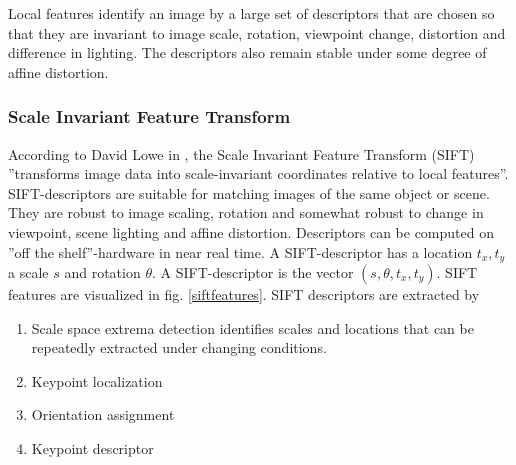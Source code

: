 \documentclass[english,12pt,a4paper,pdftex,elec,utf8, table]{aaltothesis}
\begin{document}
Local features identify an image by a large set of descriptors that are chosen so that they are invariant to image scale, rotation, viewpoint change, distortion and difference in lighting. The descriptors also remain stable under some degree of affine distortion. \cite{Lowe2004}

\subsubsection{Scale Invariant Feature Transform} \label{SIFTSection}
According to David Lowe in \cite{Lowe2004}, the Scale Invariant Feature Transform (SIFT) ''transforms image data into scale-invariant coordinates relative to local features''. SIFT-descriptors are suitable for matching images of the same object or scene. They are robust to image scaling, rotation and somewhat robust to change in viewpoint, scene lighting and affine distortion. Descriptors can be computed on ''off the shelf''-hardware in near real time. A SIFT-descriptor has a location $t_x, t_y$ a scale $s$ and rotation $\theta$. A SIFT-descriptor is the vector $(s, \theta, t_x, t_y)$. SIFT features are visualized in fig. \ref{siftfeatures}. SIFT descriptors are extracted by

\begin{enumerate}
\item Scale space extrema detection identifies scales and locations that can be repeatedly extracted under changing conditions.
\item Keypoint localization
\item Orientation assignment
\item Keypoint descriptor
\end{enumerate}
\end{document}

